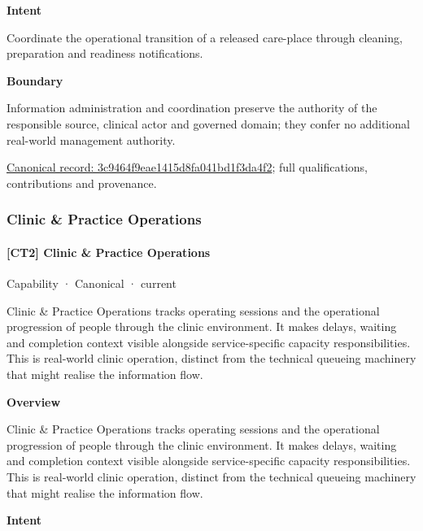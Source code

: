 \textbf{Intent}



Coordinate the operational transition of a released care-place through cleaning, preparation and readiness notifications.



\textbf{Boundary}



Information administration and coordination preserve the authority of the responsible source, clinical actor and governed domain; they confer no additional real-world management authority.


{\footnotesize \href{../../../../continuum/strategy/capability/3c9464f9eae1415d8fa041bd1f3da4f2.md}{Canonical record: 3c9464f9eae1415d8fa041bd1f3da4f2}; full qualifications, contributions and provenance.}\par
\subsubsection{Clinic \& Practice Operations}

\paragraph{[CT2] Clinic \& Practice Operations}

\label{element:3dffe63e03124efab255204ee4e9a5d9}
{\small Capability · Canonical · current}\par

Clinic \& Practice Operations tracks operating sessions and the operational progression of people through the clinic environment. It makes delays, waiting and completion context visible alongside service-specific capacity responsibilities. This is real-world clinic operation, distinct from the technical queueing machinery that might realise the information flow.



\textbf{Overview}



Clinic \& Practice Operations tracks operating sessions and the operational progression of people through the clinic environment. It makes delays, waiting and completion context visible alongside service-specific capacity responsibilities. This is real-world clinic operation, distinct from the technical queueing machinery that might realise the information flow.



\textbf{Intent}



